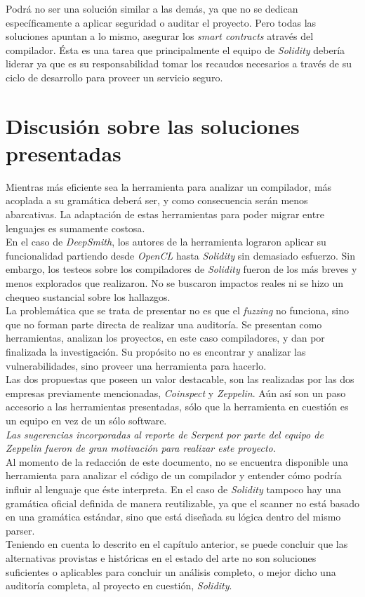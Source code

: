 Podrá no ser una solución similar a las demás, ya que no se dedican específicamente a aplicar seguridad o auditar el proyecto. Pero todas las soluciones apuntan a lo mismo, asegurar los \textit{smart contracts} através del compilador. Ésta es una tarea que principalmente el equipo de \textit{Solidity} debería liderar ya que es su responsabilidad tomar los recaudos necesarios a través de su ciclo de desarrollo para proveer un servicio seguro.

\section{Discusión sobre las soluciones presentadas}
Mientras más eficiente sea la herramienta para analizar un compilador, más acoplada a su gramática deberá ser, y como consecuencia serán menos abarcativas. La adaptación de estas herramientas para poder migrar entre lenguajes es sumamente costosa.\\

En el caso de \textit{DeepSmith}, los autores de la herramienta lograron aplicar su funcionalidad partiendo desde \textit{OpenCL} hasta \textit{Solidity} sin demasiado esfuerzo. Sin embargo, los testeos sobre los compiladores de \textit{Solidity} fueron de los más breves y menos explorados que realizaron. No se buscaron impactos reales ni se hizo un chequeo sustancial sobre los hallazgos.\\

La problemática que se trata de presentar no es que el \textit{fuzzing} no funciona, sino que no forman parte directa de realizar una auditoría. Se presentan como herramientas, analizan los proyectos, en este caso compiladores, y dan por finalizada la investigación. Su propósito no es encontrar y analizar las vulnerabilidades, sino proveer una herramienta para hacerlo.\\

Las dos propuestas que poseen un valor destacable, son las realizadas por las dos empresas previamente mencionadas, \textit{Coinspect} y \textit{Zeppelin}. Aún así son un paso accesorio a las herramientas presentadas, sólo que la herramienta en cuestión es un equipo en vez de un sólo software.\\

\textit{Las sugerencias incorporadas al reporte de Serpent por parte del equipo de Zeppelin fueron de gran motivación para realizar este proyecto.}\\

Al momento de la redacción de este documento, no se encuentra disponible una herramienta para analizar el código de un compilador y entender cómo podría influir al lenguaje que éste interpreta. En el caso de \textit{Solidity} tampoco hay una gramática oficial definida de manera reutilizable, ya que el scanner no está basado en una gramática estándar, sino que está diseñada su lógica dentro del mismo parser.\\

Teniendo en cuenta lo descrito en el capítulo anterior, se puede concluir que las alternativas provistas e históricas en el estado del arte no son soluciones suficientes o aplicables para concluir un análisis completo, o mejor dicho una auditoría completa, al proyecto en cuestión, \textit{Solidity}.
